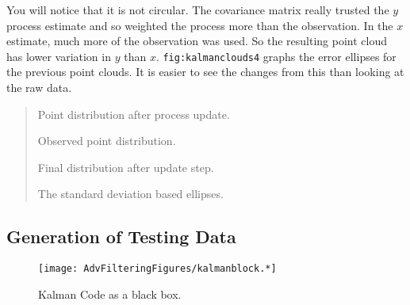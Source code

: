 \begin{Shaded}
\begin{Highlighting}[]
\OperatorTok{,}\OperatorTok{,}\OperatorTok{=}\NormalTok{(}\OperatorTok{,}\NormalTok{)}\OperatorTok{,}\OperatorTok{=}\NormalTok{(}\OperatorTok{,} \NormalTok{)}\OperatorTok{,}\OperatorTok{=} \NormalTok{)}
\OperatorTok{!}\OperatorTok{,}\OperatorTok{,}\OperatorTok{=}\NormalTok{(}\OperatorTok{,}\NormalTok{)}\OperatorTok{,}\OperatorTok{=}\NormalTok{(}\OperatorTok{,} \NormalTok{)}\OperatorTok{,}\OperatorTok{=} \NormalTok{)}
\OperatorTok{!}\OperatorTok{,}\OperatorTok{,}\OperatorTok{=}\NormalTok{(}\OperatorTok{,}\NormalTok{)}\OperatorTok{,}\OperatorTok{=}\NormalTok{(}\OperatorTok{,} \NormalTok{)}\OperatorTok{,}\OperatorTok{=} \NormalTok{)}
\end{Highlighting}
\end{Shaded}

You will notice that it is not circular. The covariance matrix really
trusted the \(y\) process estimate and so weighted the process more than
the observation. In the \(x\) estimate, much more of the observation was
used. So the resulting point cloud has lower variation in \(y\) than
\(x\). \texttt{fig:kalmanclouds4} graphs the error ellipses for the
previous point clouds. It is easier to see the changes from this than
looking at the raw data.

\begin{quote}
Point distribution after process update.

Observed point distribution.

Final distribution after update step.

The standard deviation based ellipses.
\end{quote}

\hypertarget{generation-of-testing-data}{%
\subsection{Generation of Testing
Data}\label{generation-of-testing-data}}

\begin{figure}
\centering
\texttt{[image: AdvFilteringFigures/kalmanblock.*]}
\caption{Kalman Code as a black box.}
\end{figure}

